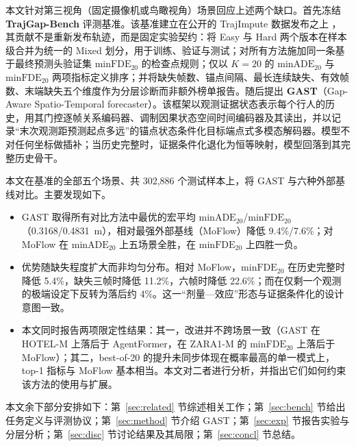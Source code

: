 本文针对第三视角（固定摄像机或鸟瞰视角）场景回应上述两个缺口。首先冻结 \textbf{TrajGap-Bench} 评测基准。该基准建立在公开的 TrajImpute 数据发布之上 \cite{chib2024pedestrian}，其贡献不是重新发布轨迹，而是固定实验契约：将 Easy 与 Hard 两个版本在样本级合并为统一的 Mixed 划分，用于训练、验证与测试；对所有方法施加同一条基于最终预测头验证集 $\mathrm{minFDE}_{20}$ 的检查点规则；仅以 $K=20$ 的 $\mathrm{minADE}_{20}$ 与 $\mathrm{minFDE}_{20}$ 两项指标定义排序；并将缺失帧数、锚点间隔、最长连续缺失、有效帧数、末端缺失五个维度作为分层诊断而非额外榜单报告。随后提出 \textbf{GAST}（Gap-Aware Spatio-Temporal forecaster）。该框架以观测证据状态表示每个行人的历史，用其门控逐帧关系编码器、调制因果状态空间时间编码器及其读出，并以记录“末次观测距预测起点多远”的锚点状态条件化目标端点式多模态解码器。模型不对任何坐标做插补；当历史完整时，证据条件化退化为恒等映射，模型回落到其完整历史骨干。

本文在基准的全部五个场景、共 302{,}886 个测试样本上，将 GAST 与六种外部基线对比。主要发现如下。
\begin{itemize}
\item GAST 取得所有对比方法中最优的宏平均 $\mathrm{minADE}_{20}$/$\mathrm{minFDE}_{20}$（0.3168/0.4831~m），相对最强外部基线（MoFlow）降低 9.4\%/7.6\%；对 MoFlow 在 $\mathrm{minADE}_{20}$ 上五场景全胜，在 $\mathrm{minFDE}_{20}$ 上四胜一负。
\item 优势随缺失程度扩大而非均匀分布。相对 MoFlow，$\mathrm{minFDE}_{20}$ 在历史完整时降低 5.4\%，缺失三帧时降低 11.2\%，六帧时降低 22.6\%；而在仅剩一个观测的极端设定下反转为落后约 4\%。这一“剂量—效应”形态与证据条件化的设计意图一致。
\item 本文同时报告两项限定性结果：其一，改进并不跨场景一致（GAST 在 HOTEL-M 上落后于 AgentFormer，在 ZARA1-M 的 $\mathrm{minFDE}_{20}$ 上落后于 MoFlow）；其二，best-of-20 的提升未同步体现在概率最高的单一模式上，top-1 指标与 MoFlow 基本相当。本文对二者进行分析，并指出它们如何约束该方法的使用与扩展。
\end{itemize}

本文余下部分安排如下：第~\ref{sec:related} 节综述相关工作；第~\ref{sec:bench} 节给出任务定义与评测协议；第~\ref{sec:method} 节介绍 GAST；第~\ref{sec:exp} 节报告实验与分层分析；第~\ref{sec:disc} 节讨论结果及其局限；第~\ref{sec:concl} 节总结。
